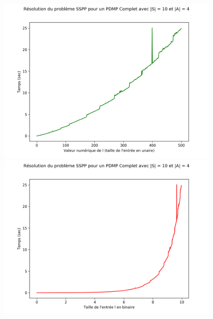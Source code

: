 \documentclass[12pt,a4paper]{report}
\theoremstyle{definition}%
\theoremstyle{remark}
\begin{document}
\begin{figure}[h]
	\centering
	\captionsetup{justification=centering}
	\begin{minipage}[b]{0.45\textwidth}
		\includegraphics[scale=0.4]{figures/sspp_pseudopoly2.png}
	\end{minipage}
	\hspace{0.05\textwidth}
	\begin{minipage}[b]{0.45\textwidth}
		\includegraphics[scale=0.4]{figures/sspp_pseudopoly3.png}
	\end{minipage}

\end{figure}
\end{document}

